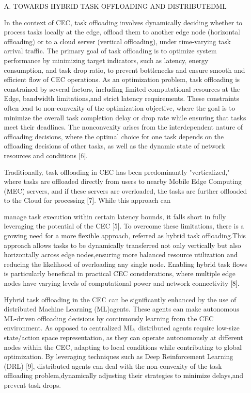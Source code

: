 \documentclass{article}
\begin{document}
A. TOWARDS HYBRID TASK OFFLOADING AND DISTRIBUTEDML

In the context of CEC, task offloading involves dynamically deciding whether to process tasks locally at the edge, offload them to another edge node (horizontal offloading) or to a cloud server (vertical offloading), under time-varying task arrival traffic. The primary goal of task offloading is to optimize system performance by minimizing target indicators, such as latency, energy consumption, and task drop ratio, to prevent bottlenecks and ensure smooth and efficient flow of CEC operations. As an optimization problem, task offloading is constrained by several factors, including limited computational resources at the Edge, bandwidth limitations,and strict latency requirements. These constraints often lead to non-convexity of the optimization objective, where the goal is to minimize the overall task completion delay or drop rate while ensuring that tasks meet their deadlines. The nonconvexity arises from the interdependent nature of offloading decisions, where the optimal choice for one task depends on the offloading decisions of other tasks, as well as the dynamic state of network resources and conditions [6].

Traditionally, task offloading in CEC has been predominantly "verticalized," where tasks are offloaded directly from users to nearby Mobile Edge Computing (MEC) servers, and if these servers are overloaded, the tasks are further offloaded to the Cloud for processing [7]. While this approach can

manage task execution within certain latency bounds, it falls short in fully leveraging the potential of the CEC [5]. To overcome these limitations, there is a growing need for a more flexible approach, referred as hybrid task offloading.This approach allows tasks to be dynamically transferred not only vertically but also horizontally across edge nodes,ensuring more balanced resource utilization and reducing the likelihood of overloading any single node. Enabling hybrid task flows is particularly beneficial in practical CEC considerations, where multiple edge nodes have varying levels of computational power and network connectivity [8].

Hybrid task offloading in the CEC can be significantly enhanced by the use of distributed Machine Learning (ML)agents. These agents can make autonomous ML-driven offloading decisions by continuously learning from the CEC environment. As opposed to centralized ML, distributed agents require low-size state/action space representation, as they can operate autonomously at different nodes within the CEC, adapting to local conditions while contributing to global optimization. By leveraging techniques such as Deep Reinforcement Learning (DRL) [9], distributed agents can deal with the non-convexity of the task offloading problem,dynamically adjusting their strategies to minimize delays,and prevent task drops.
\end{document}
